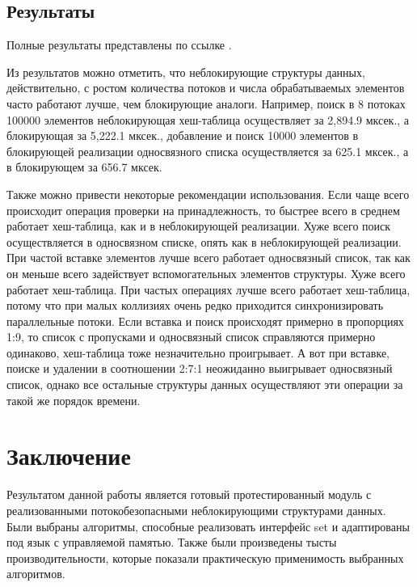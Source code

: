 \documentclass[12pt]{report}
\begin{document}
{		\section{Результаты}
		\par Полные результаты представлены по ссылке \cite{My}.
		\par Из результатов можно отметить, что неблокирующие структуры данных, действительно, с ростом количества потоков и числа обрабатываемых элементов часто работают лучше, чем блокирующие аналоги. Например, поиск в 8 потоках 100000 элементов неблокирующая хеш-таблица осуществляет за 2,894.9 мксек., а блокирующая за 5,222.1 мксек., добавление и поиск 10000 элементов в блокирующей реализации односвязного списка осуществляется за 625.1 мксек., а в блокирующем за 656.7 мксек.
		\par Также можно привести некоторые рекомендации использования. Если чаще всего происходит операция проверки на принадлежность, то быстрее всего в среднем работает хеш-таблица, как и в неблокирующей реализации. Хуже всего поиск осуществляется в односвязном списке, опять как в неблокирующей реализации. При частой вставке элементов лучше всего работает односвязный список, так как он меньше всего задействует вспомогательных элементов структуры. Хуже всего работает хеш-таблица. При частых операциях лучше всего работает хеш-таблица, потому что при малых коллизиях очень редко приходится синхронизировать параллельные потоки. Если вставка и поиск происходят примерно в пропорциях 1:9, то список с пропусками и односвязный список справляются примерно одинаково, хеш-таблица тоже незначительно проигрывает. А вот при вставке, поиске и удалении в соотношении 2:7:1 неожиданно выигрывает односвязный список, однако все остальные структуры данных осуществляют эти операции за такой же порядок времени.				
		
		\newpage
		
		\chapter*{Заключение}
		\par Результатом данной работы является готовый протестированный модуль с реализованными потокобезопасными неблокирующими структурами данных. Были выбраны алгоритмы, способные реализовать интерфейс set и адаптированы под язык с управляемой памятью. Также были произведены тысты производительности, которые показали практическую применимость выбранных алгоритмов.
		
		
		  
		
		\newpage
	}
	
\end{document}

